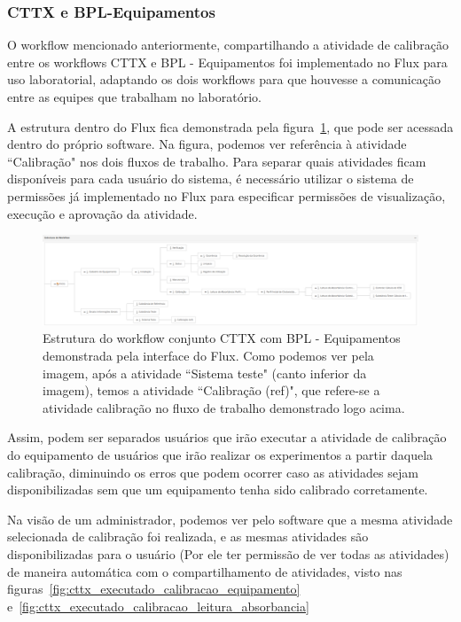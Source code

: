 \subsubsection{CTTX e BPL-Equipamentos}

O workflow mencionado anteriormente, compartilhando a atividade de calibração entre os workflows CTTX e BPL - Equipamentos foi implementado no Flux para uso laboratorial, adaptando os dois workflows para que houvesse a comunicação entre as equipes que trabalham no laboratório.

A estrutura dentro do Flux fica demonstrada pela figura~\ref{fig:cttx_bpl_flux}, que pode ser acessada dentro do próprio software. Na figura, podemos ver referência à atividade ``Calibração" nos dois fluxos de trabalho. Para separar quais atividades ficam disponíveis para cada usuário do sistema, é necessário utilizar o sistema de permissões já implementado no Flux para especificar permissões de visualização, execução e aprovação da atividade.

\begin{figure}
    \centering
    \includegraphics[width=1\textwidth]{imgs/CTTX-EQP/estrutura_cttx_eqp_flux.png}
    \caption{Estrutura do workflow conjunto CTTX com BPL - Equipamentos demonstrada pela interface do Flux. Como podemos ver pela imagem, após a atividade ``Sistema teste" (canto inferior da imagem), temos a atividade ``Calibração (ref)", que refere-se a atividade calibração no fluxo de trabalho demonstrado logo acima.}
    \label{fig:cttx_bpl_flux}
\end{figure}

Assim, podem ser separados usuários que irão executar a atividade de calibração do equipamento de usuários que irão realizar os experimentos a partir daquela calibração, diminuindo os erros que podem ocorrer caso as atividades sejam disponibilizadas sem que um equipamento tenha sido calibrado corretamente.

Na visão de um administrador, podemos ver pelo software que a mesma atividade selecionada de calibração foi realizada, e as mesmas atividades são disponibilizadas para o usuário (Por ele ter permissão de ver todas as atividades) de maneira automática com o compartilhamento de atividades, visto nas figuras~\ref{fig:cttx_executado_calibracao_equipamento} e~\ref{fig:cttx_executado_calibracao_leitura_absorbancia}

